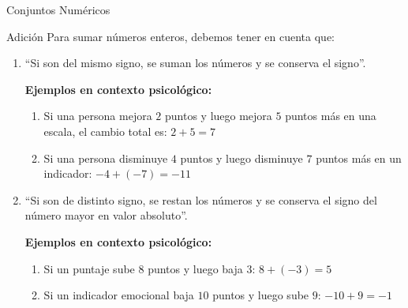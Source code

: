 \documentclass[aspectratio=169,handout,11pt]{beamer}
\begin{document}
	\begin{frame}{Conjuntos Numéricos}\small{
		\begin{block}{Adición}
			Para sumar números enteros, debemos tener en cuenta que:
			
			\begin{enumerate}
				\item ``Si son del mismo signo, se suman los números y se conserva el signo''.
				
				\textbf{Ejemplos en contexto psicológico:}
				\begin{enumerate}
					\item Si una persona mejora $2$ puntos y luego mejora $5$ puntos más en una escala, el cambio total es:
					$
					2+5=7
					$
					
					\item Si una persona disminuye $4$ puntos y luego disminuye $7$ puntos más en un indicador:
					$
					-4+(-7)=-11
					$
					\pause
				\end{enumerate}
				
				\item ``Si son de distinto signo, se restan los números y se conserva el signo del número mayor en valor absoluto''.
				\small{
				\textbf{Ejemplos en contexto psicológico:}
				\begin{enumerate}
					\item Si un puntaje sube $8$ puntos y luego baja $3$:
					$
					8+(-3)=5
					$
					
					\item Si un indicador emocional baja $10$ puntos y luego sube $9$:
					$
					-10+9=-1
					$
				\end{enumerate}
			}
			\end{enumerate}
		\end{block}}
	\end{frame}
	
\end{document}
